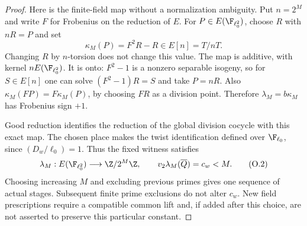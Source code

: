 \begin{proof}
Here is the finite-field map without a normalization ambiguity.
Put $n=2^M$ and write $F$ for Frobenius on the reduction of $E$.
For $P\in E(\F_{\ell_0^2})$, choose $R$ with $nR=P$ and set
\[
                    \kappa_M(P)=F^2R-R\in E[n]=T/nT.
\]
Changing $R$ by $n$-torsion does not change this value.
The map is additive, with kernel $nE(\F_{\ell_0^2})$.
It is onto: $F^2-1$ is a nonzero separable isogeny, so for
$S\in E[n]$ one can solve $(F^2-1)R=S$ and take $P=nR$.
Also $\kappa_M(FP)=F\kappa_M(P)$, by choosing $FR$ as a
division point. Therefore $\lambda_M=b\kappa_M$ has
Frobenius sign $+1$.

Good reduction identifies the reduction of the global division
cocycle with this exact map. The chosen place makes the twist
identification defined over $\F_{\ell_0}$, since
$(D_w/\ell_0)=1$. Thus the fixed witness satisfies
\[
 \lambda_M:E(\F_{\ell_0^2})\longrightarrow\Z/2^M\Z,\qquad
 v_2\lambda_M(\overline Q)=c_w<M.                         \tag{O.2}
\]
Choosing increasing $M$ and excluding previous primes gives one
sequence of actual stages. Subsequent finite prime exclusions
do not alter $c_w$. New field prescriptions require a compatible
common lift and, if added after this choice, are not asserted to
preserve this particular constant.
\end{proof}

